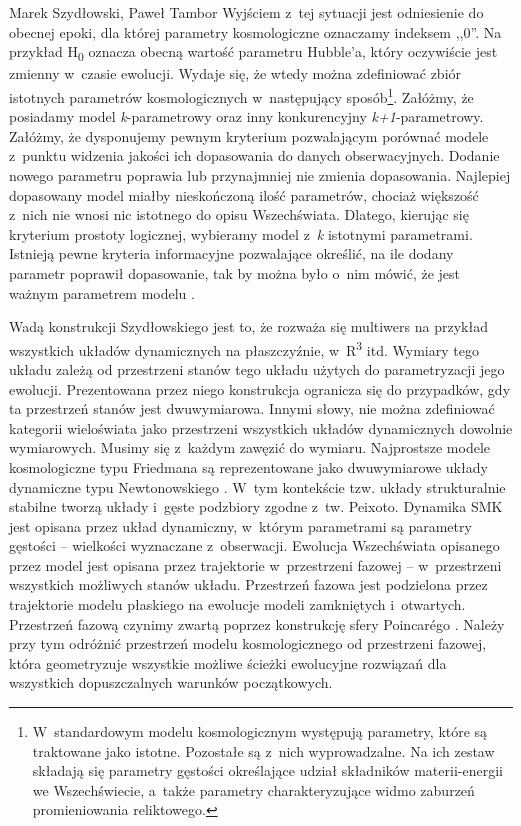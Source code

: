 \begin{artplenv2auth}{Marek Szydłowski, Paweł Tambor}
Wyjściem z~tej sytuacji jest odniesienie do obecnej epoki, dla której parametry kosmologiczne oznaczamy indeksem ,,0''. Na przykład H\textsubscript{0} oznacza obecną wartość parametru Hubble'a, który oczywiście jest zmienny w~czasie ewolucji. Wydaje się, że wtedy można zdefiniować zbiór istotnych parametrów kosmologicznych w~następujący sposób\footnote{W~standardowym modelu kosmologicznym występują parametry, które są traktowane jako istotne. Pozostałe są z~nich wyprowadzalne. Na ich zestaw składają się parametry gęstości określające udział składników materii-energii we Wszechświecie, a~także parametry charakteryzujące widmo zaburzeń promieniowania reliktowego.}. Załóżmy, że posiadamy model \textit{k}-parametrowy oraz inny konkurencyjny \textit{k+1}-parametrowy. Załóżmy, że dysponujemy pewnym kryterium pozwalającym porównać modele z~punktu widzenia jakości ich dopasowania do danych obserwacyjnych. Dodanie nowego parametru poprawia lub przynajmniej nie zmienia dopasowania. Najlepiej dopasowany model miałby nieskończoną ilość parametrów, chociaż większość z~nich nie wnosi nic istotnego do opisu Wszechświata. Dlatego, kierując się kryterium prostoty logicznej, wybieramy model z~\textit{k} istotnymi parametrami. Istnieją pewne kryteria informacyjne pozwalające określić, na ile dodany parametr poprawił dopasowanie, tak by można było o~nim mówić, że jest ważnym parametrem modelu
\parencite[][]{szydlowski_towards_2007}.%


Wadą konstrukcji Szydłowskiego jest to, że rozważa się multiwers na przykład wszystkich układów dynamicznych na płaszczyźnie, w~R\textsuperscript{3} itd. Wymiary tego układu zależą od przestrzeni stanów tego układu użytych do parametryzacji jego ewolucji. Prezentowana przez niego konstrukcja ogranicza się do przypadków, gdy ta przestrzeń stanów jest dwuwymiarowa. Innymi słowy, nie można zdefiniować kategorii wieloświata jako przestrzeni wszystkich układów dynamicznych dowolnie wymiarowych. Musimy się z~każdym zawęzić do wymiaru. Najprostsze modele kosmologiczne typu Friedmana są reprezentowane jako dwuwymiarowe układy dynamiczne typu Newtonowskiego
\parencites[][]{szydlowski_towards_2007}[por.][]{szydlowski_filozoficzne_1983}. %
 W~tym kontekście tzw. układy strukturalnie stabilne tworzą układy i~gęste podzbiory zgodne z~tw. Peixoto. Dynamika SMK jest opisana przez układ dynamiczny, w~którym parametrami są parametry gęstości -- wielkości wyznaczane z~obserwacji. Ewolucja Wszechświata opisanego przez model jest opisana przez trajektorie w~przestrzeni fazowej -- w~przestrzeni wszystkich możliwych stanów układu. Przestrzeń fazowa jest podzielona przez trajektorie modelu płaskiego na ewolucje modeli zamkniętych i~otwartych. Przestrzeń fazową czynimy zwartą poprzez konstrukcję sfery Poincarégo
\parencite{perko_differential_1996}.
 Należy przy tym odróżnić przestrzeń modelu kosmologicznego od przestrzeni fazowej, która geometryzuje wszystkie możliwe ścieżki ewolucyjne rozwiązań dla wszystkich dopuszczalnych warunków początkowych.


\end{artplenv2auth}
